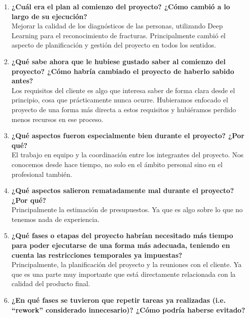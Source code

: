 	
 
\begin{enumerate}
	\item \textbf{¿Cuál era el plan al comienzo del proyecto? ¿Cómo cambió a lo largo de su ejecución?} \\
	
		   Mejorar la calidad de los diagnósticos de las personas, utilizando Deep Learning para el reconocimiento de fracturas. Principalmente cambió el aspecto de planificación y gestión del proyecto en todos los sentidos.
		   
	\item \textbf{¿Qué sabe ahora que le hubiese gustado saber al comienzo del proyecto? ¿Cómo habría cambiado el proyecto de haberlo sabido antes?} \\
	
		  Los requisitos del cliente es algo que interesa saber de forma clara desde el principio, cosa que prácticamente nunca ocurre. Hubieramos enfocado el proyecto de una forma más directa a estos requisitos y hubiéramos perdido menos recursos en ese proceso.
		  
	\item \textbf{¿Qué aspectos fueron especialmente bien durante el proyecto? ¿Por qué?} \\
	
				El trabajo en equipo y la coordinación entre los integrantes del proyecto. Nos conocemos desde hace tiempo, no solo en el ámbito personal sino en el profesional también.
				
	\item \textbf{¿Qué aspectos salieron rematadamente mal durante el proyecto? ¿Por qué?} \\
	
				Principalmente la estimación de presupuestos. Ya que es algo sobre lo que no tenemos nada de experiencia.
				
	\item \textbf{¿Qué fases o etapas del proyecto habrían necesitado más tiempo para poder ejecutarse de una forma más adecuada, teniendo en cuenta las restricciones temporales ya impuestas?} \\
	
				Principalmente, la planificación del proyecto y la reuniones con el cliente. Ya que es una parte muy importante que está directamente relacionada con la calidad del producto final.
				
	\item \textbf{¿En qué fases se tuvieron que repetir tareas ya realizadas (i.e. “rework” considerado innecesario)? ¿Cómo podría haberse evitado?}\\
	

\end{enumerate}
